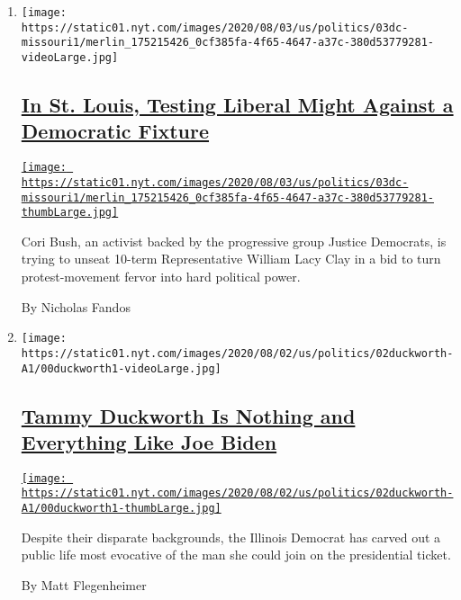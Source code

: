 \begin{enumerate}
\def\labelenumi{\arabic{enumi}.}
\item
  \texttt{[image: https://static01.nyt.com/images/2020/08/03/us/politics/03dc-missouri1/merlin\_175215426\_0cf385fa-4f65-4647-a37c-380d53779281-videoLarge.jpg]}

  \hypertarget{in-st-louis-testing-liberal-might-against-a-democratic-fixture}{%
  \subsection{\texorpdfstring{\href{/2020/08/02/us/politics/cori-bush-william-lacy-clay-missouri.html}{In
  St. Louis, Testing Liberal Might Against a Democratic
  Fixture}}{In St. Louis, Testing Liberal Might Against a Democratic Fixture}}\label{in-st-louis-testing-liberal-might-against-a-democratic-fixture}}

  \href{/2020/08/02/us/politics/cori-bush-william-lacy-clay-missouri.html}{\texttt{[image: https://static01.nyt.com/images/2020/08/03/us/politics/03dc-missouri1/merlin\_175215426\_0cf385fa-4f65-4647-a37c-380d53779281-thumbLarge.jpg]}}

  Cori Bush, an activist backed by the progressive group Justice
  Democrats, is trying to unseat 10-term Representative William Lacy
  Clay in a bid to turn protest-movement fervor into hard political
  power.

  By Nicholas Fandos
\item
  \texttt{[image: https://static01.nyt.com/images/2020/08/02/us/politics/02duckworth-A1/00duckworth1-videoLarge.jpg]}

  \hypertarget{tammy-duckworth-is-nothing-and-everything-like-joe-biden}{%
  \subsection{\texorpdfstring{\href{/2020/08/01/us/politics/tammy-duckworth-biden-vp.html}{Tammy
  Duckworth Is Nothing and Everything Like Joe
  Biden}}{Tammy Duckworth Is Nothing and Everything Like Joe Biden}}\label{tammy-duckworth-is-nothing-and-everything-like-joe-biden}}

  \href{/2020/08/01/us/politics/tammy-duckworth-biden-vp.html}{\texttt{[image: https://static01.nyt.com/images/2020/08/02/us/politics/02duckworth-A1/00duckworth1-thumbLarge.jpg]}}

  Despite their disparate backgrounds, the Illinois Democrat has carved
  out a public life most evocative of the man she could join on the
  presidential ticket.

  By Matt Flegenheimer
\end{enumerate}

